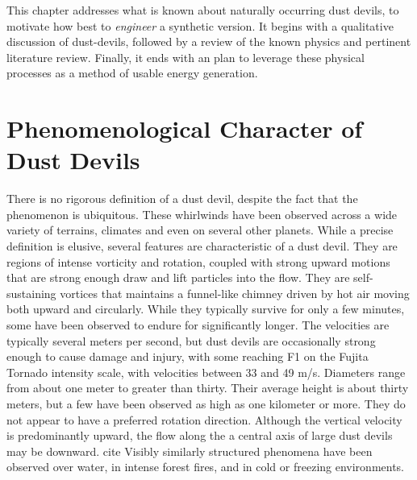 \label{sec:physics}

This chapter addresses what is known about naturally occurring dust
devils, to motivate how best to \textit{engineer} a synthetic version. 
It begins with a qualitative discussion of dust-devils, followed by a
review of the known physics and pertinent literature review. Finally, it
ends with an plan to leverage these physical processes as a method of
usable energy generation. 


\section{Phenomenological Character of Dust Devils}
\label{subsec:phenomena}

There is no rigorous definition of a dust devil, despite the fact that
the phenomenon is ubiquitous. These whirlwinds have been
observed across a wide variety of terrains, climates and even on several
other planets\cite{Sinclair1969,Bluestein2004,JGR:JGR13978,JGRE:JGRE1660}. 
While a precise definition is elusive, several features 
are characteristic of a dust devil. They are regions of
intense vorticity and rotation, coupled with strong upward motions 
that are strong enough draw and lift particles into the flow.
They are self-sustaining vortices that maintains a funnel-like
chimney driven by hot air moving both upward and circularly. 
While they typically survive for only a few minutes, some have 
been observed to endure for significantly longer. The velocities are 
typically several meters per second, but
%
%
dust devils are occasionally strong enough to cause damage and injury,
with some reaching F1 on the Fujita Tornado intensity
scale\cite{Edwards_tornadointensity}, with velocities between 33 and 49
m/s. 
%
%
Diameters range from about one meter to greater than thirty.  Their
average height is about thirty meters, but a few have been observed 
as high as one kilometer or more. They do not appear to have a
preferred rotation direction. Although the vertical velocity 
is predominantly upward, the flow along the a central axis of large dust
devils may be downward. 
%
%
cite
Visibly similarly structured phenomena have been observed over water, in
intense forest fires, and in cold or freezing environments. 
%
%

